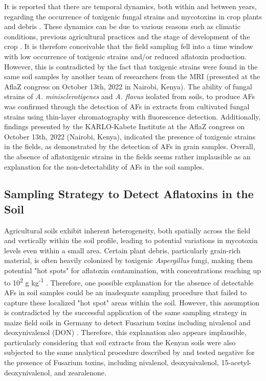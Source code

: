 \begin{refsection}
It is reported that there are temporal dynamics, both within and between years, regarding the occurrence of toxigenic fungal strains and mycotoxins in crop plants and debris \citep{abbas2008dynamics, orum1997spatial, ching2022spatial}. These dynamics can be due to various reasons such as climatic conditions, previous agricultural practices and the stage of development of the crop \citep{ching2022spatial, dutta2001isolation, jaime2010crop}. It is therefore conceivable that the field sampling fell into a time window with low occurrence of toxigenic strains and/or reduced aflatoxin production. However, this is contradicted by the fact that toxigenic strains were found in the same soil samples by another team of researchers from the MRI (presented at the AflaZ congress on October 13th, 2022 in Nairobi, Kenya). The ability of fungal strains of \textit{A. minisclerotigenes} and \textit{A. flavus} isolated from soils, to produce AFs was confirmed through the detection of AFs in extracts from cultivated fungal strains using thin-layer chromatography with fluorescence detection. Additionally, findings presented by the KARLO-Kabete Institute at the AflaZ congress on October 13th, 2022 (Nairobi, Kenya),  indicated the presence of toxigenic strains in the fields, as demonstrated by the detection of AFs in grain samples. Overall, the absence of aflatoxigenic strains in the fields seems rather implausible as an explanation for the non-detectability of AFs in the soil samples.

\subsection{Sampling Strategy to Detect Aflatoxins in the Soil}

Agricultural soils exhibit inherent heterogeneity, both spatially across the field and vertically within the soil profile, leading to potential variations in mycotoxin levels even within a small area. Certain plant debris, particularly grain-rich material, is often heavily colonized by toxigenic \textit{Aspergillus} fungi, making them potential "hot spots" for aflatoxin contamination, with concentrations reaching up to 10\textsuperscript{2} \textmu g kg\textsuperscript{-1} \citep{accinelli2008aspergillus}. Therefore, one possible explanation for the absence of detectable AFs in soil samples could be an inadequate sampling procedure that failed to capture these localized "hot spot" areas within the soil. However, this assumption is contradicted by the successful application of the same sampling strategy in maize field soils in Germany to detect Fusarium toxins including nivalenol and deoxynivalenol (DON) \citep{kenngott2022fusarium}. Therefore, this explanation also appears implausible,  particularly considering that soil extracts from the Kenyan soils were also subjected to the same analytical procedure described by \citet{kenngott2022fusarium} and tested negative for the presence of Fusarium toxins, including nivalenol, deoxynivalenol, 15-acetyl-deoxynivalenol, and zearalenone.


\end{refsection}
